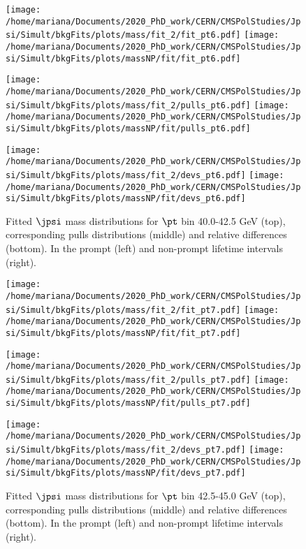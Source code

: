\pagebreak

\begin{figure}[h!]
\centering
\texttt{[image: /home/mariana/Documents/2020\_PhD\_work/CERN/CMSPolStudies/Jpsi/Simult/bkgFits/plots/mass/fit\_2/fit\_pt6.pdf]}
\texttt{[image: /home/mariana/Documents/2020\_PhD\_work/CERN/CMSPolStudies/Jpsi/Simult/bkgFits/plots/massNP/fit/fit\_pt6.pdf]}

\texttt{[image: /home/mariana/Documents/2020\_PhD\_work/CERN/CMSPolStudies/Jpsi/Simult/bkgFits/plots/mass/fit\_2/pulls\_pt6.pdf]}
\texttt{[image: /home/mariana/Documents/2020\_PhD\_work/CERN/CMSPolStudies/Jpsi/Simult/bkgFits/plots/massNP/fit/pulls\_pt6.pdf]}

\texttt{[image: /home/mariana/Documents/2020\_PhD\_work/CERN/CMSPolStudies/Jpsi/Simult/bkgFits/plots/mass/fit\_2/devs\_pt6.pdf]}
\texttt{[image: /home/mariana/Documents/2020\_PhD\_work/CERN/CMSPolStudies/Jpsi/Simult/bkgFits/plots/massNP/fit/devs\_pt6.pdf]}
\caption{Fitted $\jpsi$ mass distributions for $\pt$ bin 40.0-42.5 GeV (top), corresponding pulls distributions (middle) and relative differences (bottom). In the prompt (left) and non-prompt lifetime intervals (right).}\label{f:m_fit_6}
\end{figure}

\pagebreak

\begin{figure}[h!]
\centering
\texttt{[image: /home/mariana/Documents/2020\_PhD\_work/CERN/CMSPolStudies/Jpsi/Simult/bkgFits/plots/mass/fit\_2/fit\_pt7.pdf]}
\texttt{[image: /home/mariana/Documents/2020\_PhD\_work/CERN/CMSPolStudies/Jpsi/Simult/bkgFits/plots/massNP/fit/fit\_pt7.pdf]}

\texttt{[image: /home/mariana/Documents/2020\_PhD\_work/CERN/CMSPolStudies/Jpsi/Simult/bkgFits/plots/mass/fit\_2/pulls\_pt7.pdf]}
\texttt{[image: /home/mariana/Documents/2020\_PhD\_work/CERN/CMSPolStudies/Jpsi/Simult/bkgFits/plots/massNP/fit/pulls\_pt7.pdf]}

\texttt{[image: /home/mariana/Documents/2020\_PhD\_work/CERN/CMSPolStudies/Jpsi/Simult/bkgFits/plots/mass/fit\_2/devs\_pt7.pdf]}
\texttt{[image: /home/mariana/Documents/2020\_PhD\_work/CERN/CMSPolStudies/Jpsi/Simult/bkgFits/plots/massNP/fit/devs\_pt7.pdf]}
\caption{Fitted $\jpsi$ mass distributions for $\pt$ bin 42.5-45.0 GeV (top), corresponding pulls distributions (middle) and relative differences (bottom). In the prompt (left) and non-prompt lifetime intervals (right).}\label{f:m_fit_7}
\end{figure}

